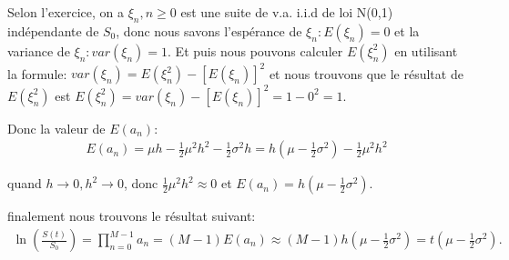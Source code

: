 \documentclass[a4paper,10pt]{report}
\begin{document}
\par Selon l'exercice, on a $\xi_{n}, n \geq 0$ est une suite de v.a. i.i.d de loi N(0,1) indépendante de $S_{0}$, donc nous savons l'espérance de $\xi_{n}: E(\xi_{n}) = 0$ et la variance de $\xi_{n}: var(\xi_{n}) = 1$.  Et puis nous pouvons calculer $E(\xi_{n}^{2})$ en utilisant la formule: $var(\xi_{n}) = E(\xi_{n}^{2}) - [E(\xi_{n})]^{2}$ et nous trouvons que le résultat de $E(\xi_{n}^{2})$ est $E(\xi_{n}^{2}) = var(\xi_{n}) - [E(\xi_{n})]^{2} = 1 - 0^{2} = 1$.
\par Donc la valeur de $E(a_{n})$:
\begin{align*}
	E(a_{n}) = \mu h -\frac{1}{2} \mu^{2} h^{2} -\frac{1}{2} \sigma^{2} h = h(\mu - \frac{1}{2} \sigma^{2}) -\frac{1}{2} \mu^{2} h^{2}
\end{align*}
\par quand $h \rightarrow 0, h^{2} \rightarrow 0$, donc $\frac{1}{2} \mu^{2} h^{2} \approx 0$ et $E(a_{n}) = h(\mu - \frac{1}{2} \sigma^{2})$.
\par finalement nous trouvons le résultat suivant:
\begin{align*}
		\ln (\frac{S(t)}{S_{0}}) = \prod_{n=0}^{M-1} a_{n} = (M-1) E(a_{n}) \approx (M - 1) h(\mu - \frac{1}{2} \sigma^{2}) = t(\mu - \frac{1}{2} \sigma^{2}).
\end{align*}
\end{document}
